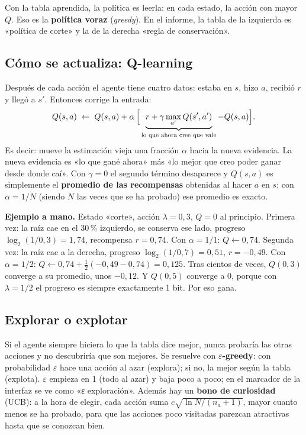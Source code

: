 Con la tabla aprendida, la política es leerla: en cada estado, la acción con mayor $Q$. Eso es la \textbf{política voraz} (\emph{greedy}). En el informe, la tabla de la izquierda es «política de corte» y la de la derecha «regla de conservación».

\subsection*{Cómo se actualiza: Q-learning}

Después de cada acción el agente tiene cuatro datos: estaba en $s$, hizo $a$, recibió $r$ y llegó a $s'$. Entonces corrige la entrada:
\[
Q(s,a) \;\leftarrow\; Q(s,a) + \alpha\,\Bigl[\,\underbrace{r + \gamma \max_{a'} Q(s',a')}_{\text{lo que ahora cree que vale}} - Q(s,a)\Bigr].
\]
Es decir: mueve la estimación vieja una fracción $\alpha$ hacia la nueva evidencia. La nueva evidencia es «lo que gané ahora» más «lo mejor que creo poder ganar desde donde caí». Con $\gamma=0$ el segundo término desaparece y $Q(s,a)$ es simplemente el \textbf{promedio de las recompensas} obtenidas al hacer $a$ en $s$; con $\alpha = 1/N$ (siendo $N$ las veces que se ha probado) ese promedio es exacto.

\textbf{Ejemplo a mano.} Estado «corte», acción $\lambda = 0{,}3$, $Q = 0$ al principio. Primera vez: la raíz cae en el 30\,\% izquierdo, se conserva ese lado, progreso $\log_2(1/0{,}3) = 1{,}74$, recompensa $r = 0{,}74$. Con $\alpha = 1/1$: $Q \leftarrow 0{,}74$. Segunda vez: la raíz cae a la derecha, progreso $\log_2(1/0{,}7)=0{,}51$, $r=-0{,}49$. Con $\alpha=1/2$: $Q \leftarrow 0{,}74 + \tfrac12(-0{,}49-0{,}74) = 0{,}125$. Tras cientos de veces, $Q(0{,}3)$ converge a su promedio, unos $-0{,}12$. Y $Q(0{,}5)$ converge a $0$, porque con $\lambda = 1/2$ el progreso es siempre exactamente 1 bit. Por eso gana.

\subsection*{Explorar o explotar}

Si el agente siempre hiciera lo que la tabla dice mejor, nunca probaría las otras acciones y no descubriría que son mejores. Se resuelve con \textbf{$\varepsilon$-greedy}: con probabilidad $\varepsilon$ hace una acción al azar (explora); si no, la mejor según la tabla (explota). $\varepsilon$ empieza en 1 (todo al azar) y baja poco a poco; en el marcador de la interfaz se ve como «ε exploración». Además hay un \textbf{bono de curiosidad} (UCB): a la hora de elegir, cada acción suma $c\sqrt{\ln N / (n_a+1)}$, mayor cuanto menos se ha probado, para que las acciones poco visitadas parezcan atractivas hasta que se conozcan bien.

